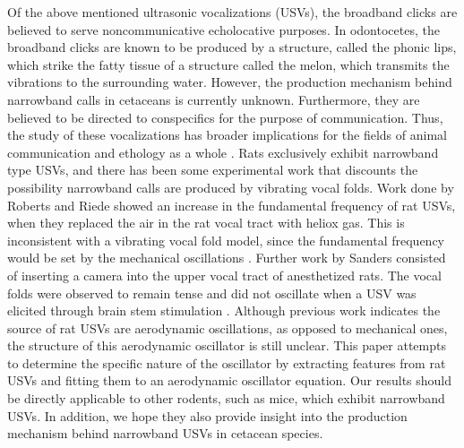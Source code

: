\documentclass[superscriptaddress, twocolumn, prl]{revtex4}
\begin{document}
Of the above mentioned ultrasonic vocalizations (USVs), the broadband clicks are believed to serve noncommunicative echolocative purposes. In odontocetes, the broadband clicks are known to be produced by a structure, called the phonic lips, which strike the fatty tissue of a structure called the melon, which transmits the vibrations to the surrounding water. However, the production mechanism behind narrowband calls in cetaceans is currently unknown. Furthermore, they are believed to be directed to conspecifics for the purpose of communication. Thus, the study of these vocalizations has broader implications for the fields of animal communication and ethology as a whole \cite{Reidenberg2010}. Rats exclusively exhibit narrowband type USVs, and there has been some experimental work that discounts the possibility narrowband calls are produced by vibrating vocal folds. Work done by Roberts and Riede showed an increase in the fundamental frequency of rat USVs, when they replaced the air in the rat vocal tract with heliox gas. This is inconsistent with a vibrating vocal fold model, since the fundamental frequency would be set by the mechanical oscillations \cite{Roberts1975, Riede2011}. Further work by Sanders consisted of inserting a camera into the upper vocal tract of anesthetized rats. The vocal folds were observed to remain tense and did not oscillate when a USV was elicited through brain stem stimulation \cite{Brudzynski2010}. Although previous work indicates the source of rat USVs are aerodynamic oscillations, as opposed to mechanical ones, the structure of this aerodynamic oscillator is still unclear. This paper attempts to determine the specific nature of the oscillator by extracting features from rat USVs and fitting them to an aerodynamic oscillator equation. Our results should be directly applicable to other rodents, such as mice, which exhibit narrowband USVs. In addition, we hope they also provide insight into the production mechanism behind narrowband USVs in cetacean species. 
\end{document}
